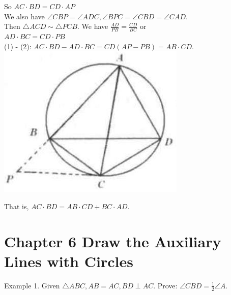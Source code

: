 \documentclass[10pt]{article}
\begin{document}
So \(A C \cdot B D=C D \cdot A P\)\\
We also have \(\angle C B P=\angle A D C, \angle B P C=\angle C B D=\angle C A D\).\\
Then \(\triangle A C D \sim \triangle P C B\). We have \(\frac{A D}{P B}=\frac{C D}{B C}\) or\\
\(A D \cdot B C=C D \cdot P B\)\\
(1) - (2): \(A C \cdot B D-A D \cdot B C=C D(A P-P B)=A B \cdot C D\).\\
\includegraphics[max width=\textwidth, center]{2025_04_17_97bc1f7e44d93c271a88g-193(1)}

That is, \(A C \cdot B D=A B \cdot C D+B C \cdot A D\).

\section*{Chapter 6 Draw the Auxiliary Lines with Circles}
Example 1. Given \(\triangle A B C, A B=A C, B D \perp A C\). Prove: \(\angle C B D=\frac{1}{2} \angle A\).
\end{document}
